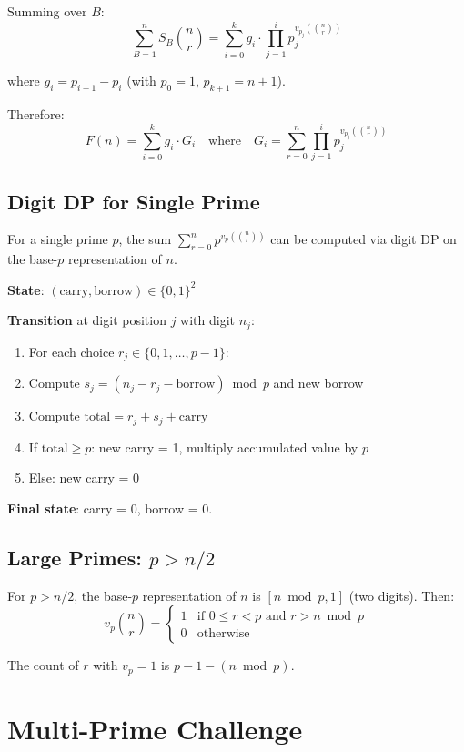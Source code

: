 \documentclass[11pt]{article}
\begin{document}
Summing over $B$:
\[
\sum_{B=1}^{n} S_B\binom{n}{r} = \sum_{i=0}^{k} g_i \cdot \prod_{j=1}^{i} p_j^{v_{p_j}(\binom{n}{r})}
\]

where $g_i = p_{i+1} - p_i$ (with $p_0 = 1$, $p_{k+1} = n+1$).

Therefore:
\[
F(n) = \sum_{i=0}^{k} g_i \cdot G_i
\quad\text{where}\quad
G_i = \sum_{r=0}^{n} \prod_{j=1}^{i} p_j^{v_{p_j}(\binom{n}{r})}
\]

\subsection{Digit DP for Single Prime}

For a single prime $p$, the sum $\sum_{r=0}^{n} p^{v_p(\binom{n}{r})}$ can be computed via digit DP on the base-$p$ representation of $n$.

\textbf{State}: $(\text{carry}, \text{borrow}) \in \{0,1\}^2$

\textbf{Transition} at digit position $j$ with digit $n_j$:
\begin{enumerate}
\item For each choice $r_j \in \{0, 1, \ldots, p-1\}$:
\item Compute $s_j = (n_j - r_j - \text{borrow}) \bmod p$ and new borrow
\item Compute $\text{total} = r_j + s_j + \text{carry}$
\item If $\text{total} \geq p$: new carry = 1, multiply accumulated value by $p$
\item Else: new carry = 0
\end{enumerate}

\textbf{Final state}: carry = 0, borrow = 0.

\subsection{Large Primes: $p > n/2$}

For $p > n/2$, the base-$p$ representation of $n$ is $[n \bmod p, 1]$ (two digits). Then:
\[
v_p\binom{n}{r} = \begin{cases} 1 & \text{if } 0 \leq r < p \text{ and } r > n \bmod p \\ 0 & \text{otherwise} \end{cases}
\]

The count of $r$ with $v_p = 1$ is $p - 1 - (n \bmod p)$.

\section{Multi-Prime Challenge}
\end{document}

